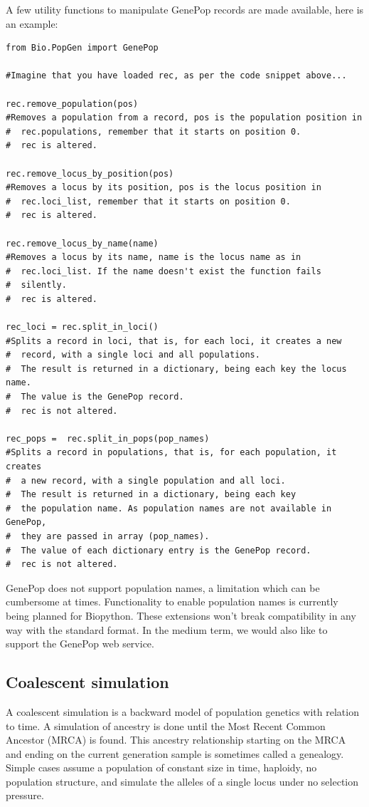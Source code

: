 \documentclass{report}
\begin{document}
A few utility functions to manipulate GenePop records are made
available, here is an example:

\begin{verbatim}
from Bio.PopGen import GenePop

#Imagine that you have loaded rec, as per the code snippet above...

rec.remove_population(pos)
#Removes a population from a record, pos is the population position in
#  rec.populations, remember that it starts on position 0.
#  rec is altered.

rec.remove_locus_by_position(pos)
#Removes a locus by its position, pos is the locus position in
#  rec.loci_list, remember that it starts on position 0.
#  rec is altered.

rec.remove_locus_by_name(name)
#Removes a locus by its name, name is the locus name as in
#  rec.loci_list. If the name doesn't exist the function fails
#  silently.
#  rec is altered.

rec_loci = rec.split_in_loci()
#Splits a record in loci, that is, for each loci, it creates a new
#  record, with a single loci and all populations.
#  The result is returned in a dictionary, being each key the locus name.
#  The value is the GenePop record.
#  rec is not altered.

rec_pops =  rec.split_in_pops(pop_names)
#Splits a record in populations, that is, for each population, it creates
#  a new record, with a single population and all loci.
#  The result is returned in a dictionary, being each key
#  the population name. As population names are not available in GenePop,
#  they are passed in array (pop_names).
#  The value of each dictionary entry is the GenePop record.
#  rec is not altered.
\end{verbatim}

GenePop does not support population names, a limitation which can be
cumbersome at times. Functionality to enable population names is currently
being planned for Biopython. These extensions won't break compatibility in
any way with the standard format.  In the medium term, we would also like to
support the GenePop web service.

\subsection{Coalescent simulation}

A coalescent simulation is a backward model of population genetics with relation to
time. A simulation of ancestry is done until the Most Recent Common Ancestor (MRCA) is found.
This ancestry relationship starting on the MRCA and ending on the current generation
sample is sometimes called a genealogy. Simple cases assume a population of constant
size in time, haploidy, no population structure, and simulate the alleles of a single
locus under no selection pressure.
\end{document}
